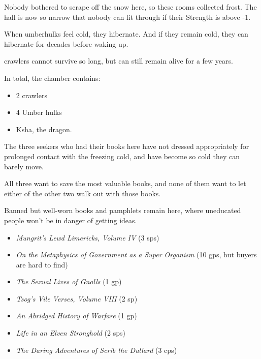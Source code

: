 \begin{multicols}{2}

Nobody bothered to scrape off the snow here, so these rooms collected frost.
The hall is now so narrow that nobody can fit through if their Strength is above -1.


When umberhulks feel cold, they hibernate.
And if they remain cold, they can hibernate for decades before waking up.

\Glspl{crawler} cannot survive so long, but can still remain alive for a few years.

In total, the chamber contains:

\begin{itemize}
  \item
  2 \glspl{crawler}
  \item
  4 Umber hulks
  \item
  Ksha, the dragon.
\end{itemize}


The three \glspl{seeker} who had their books here have not dressed appropriately for prolonged contact with the freezing cold, and have become so cold they can barely move.

All three want to save the most valuable books, and none of them want to let either of the other two walk out with those books.


Banned but well-worn books and pamphlets remain here, where uneducated people won't be in danger of getting ideas.

\begin{itemize}
  \item
  \textit{Mungrit's Lewd Limericks, Volume IV} (3 \glspl{sp})
  \item
  \textit{On the Metaphysics of Government as a Super Organism} (10 \glspl{gp}, but buyers are hard to find)
  \item
  \textit{The Sexual Lives of Gnolls} (1 \gls{gp})
  \item
  \textit{Tsog's Vile Verses, Volume VIII} (2 sp)
  \item
  \textit{An Abridged History of Warfare} (1 \gls{gp})
  \item
  \textit{Life in an Elven Stronghold} (2 \glspl{sp})
  \item
  \textit{The Daring Adventures of Scrib the Dullard} (3 \glspl{cp})
\end{itemize}

\end{multicols}
